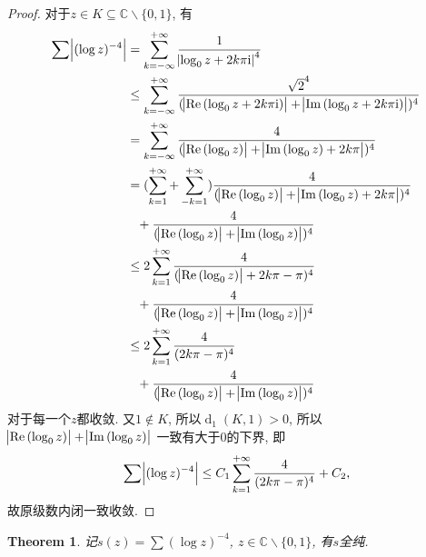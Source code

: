 \documentclass[a4paper, 12pt]{ctexart}
\newtheorem{theorem}{Theorem}[section]
\theoremstyle{plain}
\theoremstyle{plain}
\theoremstyle{plain}
\theoremstyle{nonumberplain}
\newtheorem{proof}{Proof}
\DeclareMathOperator*{\diff}{d}
\newcommand{\mi}{\mathrm{i}}
\DeclareMathOperator{\real}{Re}
\DeclareMathOperator{\image}{Im}
\begin{document}
    \begin{proof}
        对于$z\in K \subseteq \mathbb{C}\backslash\{0, 1\}$, 有
        \begin{equation}
        \begin{aligned}
            \sum{\abs{(\log{z})^{-4}}}
            &= \sum_{k=-\infty}^{+\infty}{
                \frac{1}{\abs{\log_{0}{z}+2k\pi\mi}^{4}}}\\
            &\leq \sum_{k=-\infty}^{+\infty}{
                \frac{\sqrt{2}^{4}}{(\abs{\real{(\log_{0}{z}+2k\pi\mi)}}
                +\abs{\image{(\log_{0}{z}+2k\pi\mi)}})^{4}}}\\
            &= \sum_{k=-\infty}^{+\infty}{
                \frac{4}{(\abs{\real{(\log_{0}{z})}}
                +\abs{\image{(\log_{0}{z})+2k\pi}})^{4}}}\\
            &= (\sum_{k=1}^{+\infty}+\sum_{-k=1}^{+\infty}){
                \frac{4}{(\abs{\real{(\log_{0}{z})}}
                +\abs{\image{(\log_{0}{z})+2k\pi}})^{4}}}\\
                &\phantom{=}+ \frac{4}{(\abs{\real{(\log_{0}{z})}}
                +\abs{\image{(\log_{0}{z})}})^{4}}\\
            &\leq 2\sum_{k=1}^{+\infty}{
                \frac{4}{(\abs{\real{(\log_{0}{z})}}+2k\pi-\pi)^{4}}}\\
                &\phantom{=}+\frac{4}{(\abs{\real{(\log_{0}{z})}}
                +\abs{\image{(\log_{0}{z})}})^{4}}\\
            &\leq 2\sum_{k=1}^{+\infty}{
                \frac{4}{(2k\pi-\pi)^{4}}}\\
                &\phantom{=}+\frac{4}{(\abs{\real{(\log_{0}{z})}}
                +\abs{\image{(\log_{0}{z})}})^{4}}
        \end{aligned}
        \end{equation}
        对于每一个$z$都收敛. 又$1\notin K$, 所以$\diff_{1}{(K, 1)}>0$,
        所以$\abs{\real{(\log_{0}{z})}}+\abs{\image{(\log_{0}{z})}}$
        一致有大于0的下界, 即
        \begin{equation}
            \sum{\abs{(\log{z})^{-4}}}
            \leq C_{1}\sum_{k=1}^{+\infty}{\frac{4}{(2k\pi-\pi)^{4}}}
            + C_{2},
        \end{equation}
        故原级数内闭一致收敛.
    \end{proof}

    \begin{theorem}
        记$s(z)=\sum{(\log{z})^{-4}}$, $z\in \mathbb{C}\backslash\{0, 1\}$,
        有$s$全纯.
    \end{theorem}
\end{document}
